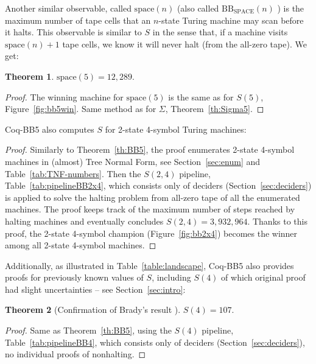 \documentclass[letterpaper,british,11pt]{article}
\theoremstyle{definition} %
\newtheorem{theorem}{Theorem}[section]
\numberwithin{equation}{section}
\theoremstyle{definition} %
\newcommand{\BBtheFourth}{107}
\newcommand{\BBTxF}{3{,}932{,}964}
\newcommand{\CoqBB}{Coq-BB5\xspace}
\begin{document}
Another similar observable, called $\text{space}(n)$ \cite{Ben-Amram1996} (also called $\text{BB}_{\text{SPACE}}(n)$ \cite{sterin_2022_14955828}) is the maximum number of tape cells that an $n$-state Turing machine may scan before it halts. This observable is similar to $S$ in the sense that, if a machine visits $\text{space}(n)+1$ tape cells, we know it will never halt (from the all-zero tape). We get:

\begin{theorem}
    $\text{space}(5) = 12{,}289$.
\end{theorem}
\begin{proof}
    The winning machine for $\text{space}(5)$ is the same as for $S(5)$, Figure~\ref{fig:bb5win}.
    Same method as for $\Sigma$, Theorem~\ref{th:Sigma5}.
\end{proof}

\CoqBB also computes $S$ for 2-state 4-symbol Turing machines:

\thBBTxF*

\begin{proof}
    Similarly to Theorem~\ref{th:BB5}, the \Coq proof enumerates 2-state 4-symbol machines in (almost) Tree Normal Form, see Section~\ref{sec:enum} and Table~\ref{tab:TNF-numbers}. Then the $S(2,4)$ pipeline, Table~\ref{tab:pipelineBB2x4}, which consists only of deciders (Section~\ref{sec:deciders}) is applied to solve the halting problem from all-zero tape of all the enumerated machines. The proof keeps track of the maximum number of steps reached by halting machines and eventually concludes $S(2,4) = \BBTxF$. Thanks to this proof, the 2-state 4-symbol champion (Figure~\ref{fig:bb2x4}) becomes the winner among all 2-state 4-symbol machines.
\end{proof}

Additionally, as illustrated in Table~\ref{table:landscape}, \CoqBB also provides \Coq proofs for previously known values of $S$, including $S(4)$ of which original proof \cite{Brady83} had slight uncertainties -- see Section~\ref{sec:intro}:

\begin{theorem}[Confirmation of Brady's result \cite{Brady83}]\label{th:BB4}
    $S(4) = \BBtheFourth$.
\end{theorem}
\begin{proof}
    Same as Theorem~\ref{th:BB5}, using the $S(4)$ pipeline, Table~\ref{tab:pipelineBB4}, which consists only of deciders (Section~\ref{sec:deciders}), \ie no individual proofs of nonhalting.
\end{proof}
\end{document}
